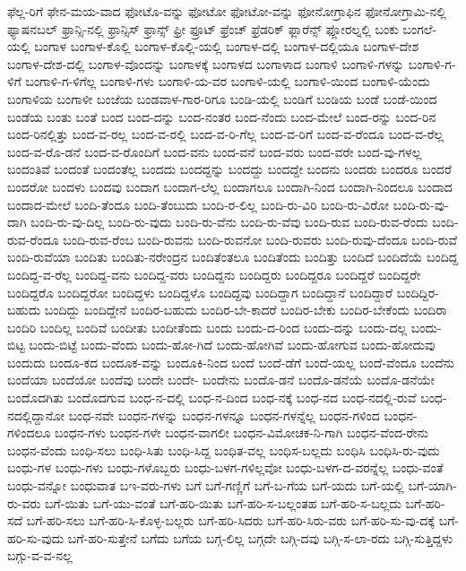{ಫೆಲ್ಲ-ರಿಗೆ
ಫೇನ-ಮಯ-ವಾದ
ಫೋಟೊ-ವನ್ನು
ಫೋಟೋ
ಫೋಟೋ-ವನ್ನು
ಫೋನೋಗ್ರಾಫಿನ
ಫೋನೋಗ್ರಾಮಿ-ನಲ್ಲಿ
ಫ್ಯಾಷನಬಲ್
ಫ್ರಾನ್ಸಿ-ನಲ್ಲಿ
ಫ್ರಾನ್ಸಿಸ್
ಫ್ರಾನ್ಸ್
ಫ್ರೀ
ಫ್ರೂಟ್
ಫ್ರೆಂಚ್
ಫ್ರೆಡರಿಕ್
ಫ್ಲಾರೆನ್ಸ್
ಫ್ಲೋರಲ್ನಲ್ಲಿ
ಬಂಕು
ಬಂಗಲೆ-ಯಲ್ಲಿ
ಬಂಗಾಳ
ಬಂಗಾಳ-ಕೊಲ್ಲಿ
ಬಂಗಾಳ-ಕೊಲ್ಲಿ-ಯಲ್ಲಿ
ಬಂಗಾಳ-ದಲ್ಲಿ
ಬಂಗಾಳ-ದಲ್ಲಿಯೂ
ಬಂಗಾಳ-ದೇಶ
ಬಂಗಾಳ-ದೇಶ-ದಲ್ಲಿ
ಬಂಗಾಳ-ವೊಂದನ್ನು
ಬಂಗಾಳಕ್ಕೆ
ಬಂಗಾಳದ
ಬಂಗಾಳಾದ
ಬಂಗಾಳಿ
ಬಂಗಾಳಿ-ಗಳನ್ನು
ಬಂಗಾಳಿ-ಗ-ಳಿಗೆ
ಬಂಗಾಳಿ-ಗ-ಳಿಗೆಲ್ಲ
ಬಂಗಾಳಿ-ಗಳು
ಬಂಗಾಳಿ-ಯ-ವರ
ಬಂಗಾಳಿ-ಯಲ್ಲಿ
ಬಂಗಾಳಿ-ಯಿಂದ
ಬಂಗಾಳಿ-ಯೆಂದು
ಬಂಗಾಳಿಯ
ಬಂಗಾಳೀ
ಬಂಜೆಯ
ಬಂಡವಾಳ-ಗಾರ-ರಿಗೂ
ಬಂಡಿ-ಯಲ್ಲಿ
ಬಂಡಿಗೆ
ಬಂಡಿಯ
ಬಂಡೆ
ಬಂಡೆ-ಯಿಂದ
ಬಂಡೆಯ
ಬಂತು
ಬಂತೆ
ಬಂದ
ಬಂದ-ದನ್ನು
ಬಂದ-ನಂತರ
ಬಂದ-ನೆಂದು
ಬಂದ-ಮೇಲೆ
ಬಂದ-ರನ್ನು
ಬಂದ-ರಿನ
ಬಂದ-ರಿನಲ್ಲಿತ್ತು
ಬಂದ-ವ-ರಲ್ಲ
ಬಂದ-ವ-ರಲ್ಲಿ
ಬಂದ-ವ-ರಿ-ಗೆಲ್ಲ
ಬಂದ-ವ-ರಿಗೆ
ಬಂದ-ವ-ರೆಂದೂ
ಬಂದ-ವ-ರೆಲ್ಲ
ಬಂದ-ವ-ರೊ-ಡನೆ
ಬಂದ-ವ-ರೊಂದಿಗೆ
ಬಂದ-ವನು
ಬಂದ-ವನೆ
ಬಂದ-ವರು
ಬಂದ-ವರೇ
ಬಂದ-ವು-ಗಳಲ್ಲ
ಬಂದಂತಿವೆ
ಬಂದಂತೆ
ಬಂದಂತೆಲ್ಲ
ಬಂದದು
ಬಂದದ್ದನ್ನು
ಬಂದದ್ದು
ಬಂದದ್ದೇ
ಬಂದನು
ಬಂದರು
ಬಂದರೂ
ಬಂದರೆ
ಬಂದರೋ
ಬಂದಳು
ಬಂದವು
ಬಂದಾಗ
ಬಂದಾಗ-ಲೆಲ್ಲ
ಬಂದಾಗಲೂ
ಬಂದಾಗಿ-ನಿಂದ
ಬಂದಾಗಿ-ನಿಂದಲೂ
ಬಂದಾದ
ಬಂದಾದ-ಮೇಲೆ
ಬಂದಿ-ತೆಂದೂ
ಬಂದಿ-ತೆಂಬುದು
ಬಂದಿ-ರ-ಲಿಲ್ಲ
ಬಂದಿ-ರು-ವಿರಿ
ಬಂದಿ-ರು-ವಿರೋ
ಬಂದಿ-ರು-ವು-ದಾಗಿ
ಬಂದಿ-ರು-ವು-ದಿಲ್ಲ
ಬಂದಿ-ರು-ವುದು
ಬಂದಿ-ರು-ವೆನು
ಬಂದಿ-ರು-ವೆವು
ಬಂದಿ-ರುವ
ಬಂದಿ-ರುವ-ರೆಂದು
ಬಂದಿ-ರುವ-ರೆಂದೂ
ಬಂದಿ-ರುವ-ರೆಂಬ
ಬಂದಿ-ರುವನು
ಬಂದಿ-ರುವನೋ
ಬಂದಿ-ರುವರು
ಬಂದಿ-ರುವು-ದೆಂದೂ
ಬಂದಿ-ರುವೆ
ಬಂದಿ-ರುವೆಯಾ
ಬಂದಿತು
ಬಂದಿತು-ನರೇಂದ್ರನ
ಬಂದಿತೆಂತಲೂ
ಬಂದಿತೆಂದು
ಬಂದಿತ್ತು
ಬಂದಿದೆ
ಬಂದಿದೆಯೆ
ಬಂದಿದ್ದ
ಬಂದಿದ್ದ-ವ-ರೆಲ್ಲ
ಬಂದಿದ್ದ-ವನು
ಬಂದಿದ್ದ-ವರು
ಬಂದಿದ್ದನು
ಬಂದಿದ್ದರು
ಬಂದಿದ್ದರೂ
ಬಂದಿದ್ದರೆ
ಬಂದಿದ್ದರೇ
ಬಂದಿದ್ದರೊ
ಬಂದಿದ್ದರೋ
ಬಂದಿದ್ದಳು
ಬಂದಿದ್ದಳೊ
ಬಂದಿದ್ದವು
ಬಂದಿದ್ದಾಗ
ಬಂದಿದ್ದಾನೆ
ಬಂದಿದ್ದಾರೆ
ಬಂದಿದ್ದಿರ-ಬಹುದು
ಬಂದಿದ್ದು
ಬಂದಿದ್ದೇನೆ
ಬಂದಿರ-ಬಹುದು
ಬಂದಿರ-ಬೇ-ಕಾದರೆ
ಬಂದಿರ-ಬೇಕು
ಬಂದಿರ-ಬೇಕೆಂದು
ಬಂದಿರಾ
ಬಂದಿರಿ
ಬಂದಿಲ್ಲ
ಬಂದಿವೆ
ಬಂದೀತು
ಬಂದೀತೆಂದು
ಬಂದು
ಬಂದು-ದ-ರಿಂದ
ಬಂದು-ದನ್ನು
ಬಂದು-ದಲ್ಲ
ಬಂದು-ಬಿಟ್ಟ
ಬಂದು-ಬಿಟ್ಟೆ
ಬಂದು-ವೆಂದು
ಬಂದು-ಹೋ-ಗಿದೆ
ಬಂದು-ಹೋಗಿವೆ
ಬಂದು-ಹೋಗುವ
ಬಂದು-ಹೋದುವು
ಬಂದುದು
ಬಂದೂ-ಕದ
ಬಂದೂಕ-ವನ್ನು
ಬಂದೂಕಿ-ನಿಂದ
ಬಂದೆ
ಬಂದೆ-ಡೆಗೆ
ಬಂದೆ-ಯಲ್ಲ
ಬಂದೆ-ವೆಂದೂ
ಬಂದೆನು
ಬಂದೆಯಾ
ಬಂದೆಯೋ
ಬಂದೆವು
ಬಂದೇ
ಬಂದೇ-
ಬಂದೇನು
ಬಂದೊ-ಡನೆ
ಬಂದೊ-ಡನೆಯೆ
ಬಂದೊ-ಡನೆಯೇ
ಬಂದೊದಗಿತು
ಬಂದೊದಗುವ
ಬಂಧ-ನ-ದಲ್ಲಿ
ಬಂಧ-ನ-ದಿಂದ
ಬಂಧ-ನಕ್ಕೆ
ಬಂಧ-ನದ
ಬಂಧ-ನದಲ್ಲಿ-ರುವೆ
ಬಂಧ-ನದಲ್ಲಿದ್ದಾನೋ
ಬಂಧ-ನವೇ
ಬಂಧನ-ಗಳನ್ನು
ಬಂಧನ-ಗಳನ್ನೂ
ಬಂಧನ-ಗಳನ್ನೆಲ್ಲ
ಬಂಧನ-ಗಳಿಂದ
ಬಂಧನ-ಗಳಿಂದಲೂ
ಬಂಧನ-ಗಳು
ಬಂಧನ-ಗಳೇ
ಬಂಧನ-ವಾಗಲೀ
ಬಂಧನ-ವಿಮೋಚಕ-ನಿ-ಗಾಗಿ
ಬಂಧನ-ವೆಂದ-ರೇನು
ಬಂಧನ-ವೆಂದು
ಬಂಧಿ-ಸಲು
ಬಂಧಿ-ಸಿತು
ಬಂಧಿ-ಸಿದ್ದ
ಬಂಧಿತ-ವಲ್ಲ
ಬಂಧಿಸ-ಬಲ್ಲದು
ಬಂಧಿಸಿ
ಬಂಧಿಸಿ-ರು-ವುದು
ಬಂಧು-ಗಳ
ಬಂಧು-ಗಳು
ಬಂಧು-ಗಳೊಬ್ಬರು
ಬಂಧು-ಬಳಗ-ಗಳಿಲ್ಲವೋ
ಬಂಧು-ಬಳಗ-ದ-ವರನ್ನೆಲ್ಲ
ಬಂಧು-ವಂತೆ
ಬಂಧು-ವನ್ನೋ
ಬಂಧುವಾತ
ಬಇ-ವರು-ಗಳು
ಬಗೆ
ಬಗೆ-ಗಣ್ಣಿಗೆ
ಬಗೆ-ಬ-ಗೆಯ
ಬಗೆ-ಯದು
ಬಗೆ-ಯಲ್ಲಿ
ಬಗೆ-ಯಾಗಿ-ರು-ವರು
ಬಗೆ-ಯಿತು
ಬಗೆ-ಯು-ವಂತೆ
ಬಗೆ-ಹರಿ-ಯಿತು
ಬಗೆ-ಹರಿ-ಸ-ಬಲ್ಲಂತಹ
ಬಗೆ-ಹರಿ-ಸ-ಬಲ್ಲದು
ಬಗೆ-ಹರಿ-ಸದೆ
ಬಗೆ-ಹರಿ-ಸಲು
ಬಗೆ-ಹರಿ-ಸಿ-ಕೊಳ್ಳ-ಬಲ್ಲರು
ಬಗೆ-ಹರಿ-ಸಿದರು
ಬಗೆ-ಹರಿ-ಸಿರು-ವರು
ಬಗೆ-ಹರಿ-ಸು-ವು-ದಕ್ಕೆ
ಬಗೆ-ಹರಿ-ಸು-ವುದು
ಬಗೆ-ಹರಿ-ಸುತ್ತೇನೆ
ಬಗೆದು
ಬಗೆಯ
ಬಗ್ಗ-ಲಿಲ್ಲ
ಬಗ್ಗದೇ
ಬಗ್ಗಿ-ದವು
ಬಗ್ಗಿ-ಸ-ಲಾ-ರದು
ಬಗ್ಗಿ-ಸುತ್ತಿದ್ದಳು
ಬಗ್ಗು-ವ-ವ-ನಲ್ಲ
}
